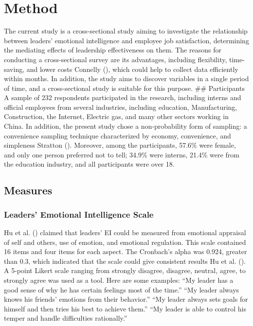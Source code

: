 \documentclass[
  man,
  longtable,
  nolmodern,
  notxfonts,
  notimes,
  colorlinks=true,linkcolor=blue,citecolor=blue,urlcolor=blue]{apa7}
\begin{document}
\section{Method}\label{method}

The current study is a cross-sectional study aiming to investigate the
relationship between leaders' emotional intelligence and employee job
satisfaction, determining the mediating effects of leadership
effectiveness on them. The reasons for conducting a cross-sectional
survey are its advantages, including flexibility, time-saving, and lower
costs Connelly (), which could
help to collect data efficiently within months. In addition, the study
aims to discover variables in a single period of time, and a
cross-sectional study is suitable for this purpose. \#\# Participants A
sample of 232 respondents participated in the research, including
interns and official employees from several industries, including
education, Manufacturing, Construction, the Internet, Electric gas, and
many other sectors working in China. In addition, the present study
chose a non-probability form of sampling: a convenience sampling
technique characterized by economy, convenience, and simpleness Stratton
(). Moreover, among the participants,
57.6\% were female, and only one person preferred not to tell; 34.9\%
were interns, 21.4\% were from the education industry, and all
participants were over 18.

\subsection{Measures}\label{measures}

\subsubsection{Leaders' Emotional Intelligence
Scale}\label{leaders-emotional-intelligence-scale}

Hu et al. () claimed that leaders' EI could
be measured from emotional appraisal of self and others, use of emotion,
and emotional regulation. This scale contained 16 items and four items
for each aspect. The Cronbach's alpha was 0.924, greater than 0.3, which
indicated that the scale could give consistent results Hu et al.
(). A 5-point Likert scale ranging from
strongly disagree, disagree, neutral, agree, to strongly agree was used
as a tool. Here are some examples: ``My leader has a good sense of why
he has certain feelings most of the time.'' ``My leader always knows his
friends' emotions from their behavior.'' ``My leader always sets goals
for himself and then tries his best to achieve them.'' ``My leader is
able to control his temper and handle difficulties rationally.''
\end{document}
